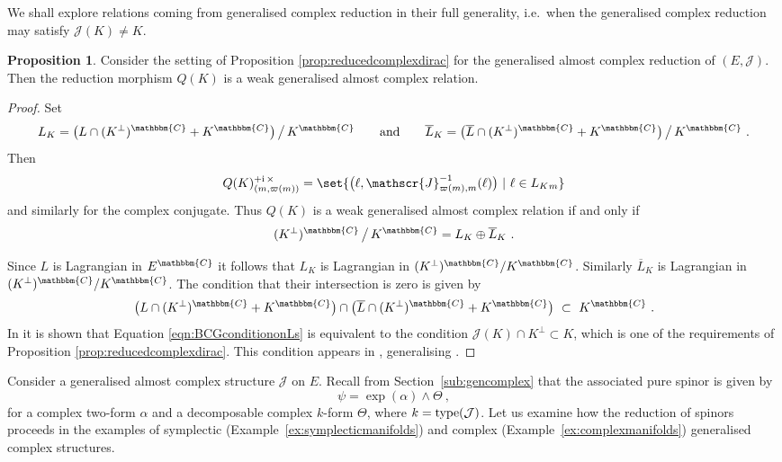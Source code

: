 \documentclass[a4paper, reqno, 11pt]{amsart}
\numberwithin{equation}{section}
\theoremstyle{definition}
\newtheorem{proposition}[equation]{Proposition}
\newcommand{\ii}{\mathrm{i}}
\newcommand{\IC}{\mathbbm{C}}
\newcommand{\cJ}{{\mathcal J}}
\theoremstyle{remark}
\begin{document}
    We shall explore relations coming from generalised complex reduction in their full generality, i.e.~when the generalised complex reduction may satisfy $\cJ(K) \neq K$.
    
    \begin{proposition}
        Consider the setting of Proposition \ref{prop:reducedcomplexdirac} for the generalised almost complex reduction of $(E, \cJ)$. Then the reduction morphism $Q(K)$ is a weak generalised almost complex relation. 
    \end{proposition}
    
    \begin{proof}
    Set $$L_K = \big(L\cap (K^\perp)^\IC + K^\IC\big)\,\big/\,K^\IC \qquad \text{and} \qquad \overline L_K = \big(\overline L \cap (K^\perp)^\IC +K^\IC\big)\,\big/\,K^\IC \ . $$ Then    
    \begin{align}
        Q(K)_{(m,\varpi(m))}^{+\ii\,\times} = \set{\big(\ell, \mathscr{J}^{-1}_{\varpi(m),m}(\ell)\big) \  \vert \ \ell \in L_K{}_m}
    \end{align}
    and similarly for the complex conjugate. Thus $Q(K)$ is a weak generalised almost complex relation if and only if $$(K^\perp)^\IC\,\big/\,K^\IC = L_K \oplus \overline L_K \ . $$ 
    
    Since $L$ is Lagrangian in $E^\IC$ it follows that $L_K$ is Lagrangian in $(K^\perp)^\IC / K^\IC$. Similarly $\overline L_K$ is Lagrangian in $(K^\perp)^\IC / K^\IC$. The condition that their intersection is zero is given by
    \begin{align}\label{eqn:BCGconditiononLs}
        \big(L\cap (K^\perp)^\IC + K^\IC\big) \cap \big(\overline L \cap (K^\perp)^\IC +K^\IC\big) \ \subset \ K^\IC \ .
    \end{align}
    In \cite[Lemma 5.1]{Bursztyn2007reduction} it is shown that Equation \eqref{eqn:BCGconditiononLs} is equivalent to the condition $\cJ(K) \cap K^\perp \subset K$, which is one of the requirements of Proposition \ref{prop:reducedcomplexdirac}. This condition appears in \cite[Proposition~6.1]{Zambon2008reduction}, generalising \cite[Theorem~5.2]{Bursztyn2007reduction}.
    \end{proof}

    Consider a generalised almost complex structure $\cJ$ on $E$. Recall from Section~\ref{sub:gencomplex} that the associated pure spinor is given by $$\psi = \exp(\alpha) \wedge \Theta \ , $$
    for a complex two-form $\alpha$ and a decomposable complex $k$-form $\Theta$, where $k={\rm type}(\cJ)$. Let us examine how the reduction of spinors proceeds in the examples of symplectic (Example~\ref{ex:symplecticmanifolds}) and complex (Example~\ref{ex:complexmanifolds}) generalised complex structures.
    
\end{document}
